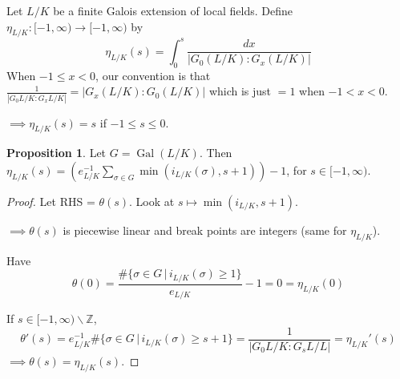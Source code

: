 \documentclass[a4paper]{article}
\theoremstyle{definition}
\theoremstyle{default}
\newtheorem{prop}[definition]{Proposition}
\theoremstyle{remark}
\newcommand*\abs[1]{\left|#1\right|}
\DeclareMathOperator{\Gal}{Gal}
\begin{document}
Let $L/K$ be a finite Galois extension of local fields.
Define $\eta_{L/K}: [-1, \infty) \to [-1, \infty)$ by
$$\eta_{L/K}(s) = \int_{0}^{s} \frac{dx}{\abs{G_0(L/K):G_x(L/K)}}$$
When $-1 \leq x < 0 $, our convention is that
$\frac{1}{\abs{G_0{L/K}:G_x{L/K}}} = \abs{G_x(L/K) : G_0(L/K)}$ which is just $=1$ when $-1 < x < 0$.

$\implies \eta_{L/K}(s)=s$ if $-1 \leq s \leq 0$.

\begin{prop}
	Let $G=\Gal(L/K)$.
	Then $\eta_{L/K}(s) = \left(e_{L/K}^{-1} \sum_{\sigma \in G}\min(i_{L/K}(\sigma), s+1)\right) - 1$,
	for $s \in [-1, \infty)$.
	\label{88}
\end{prop}
\begin{proof}
	Let RHS = $\theta(s)$.
	Look at $s \mapsto \min(i_{L/K}, s+1)$.
	
	$\implies \theta(s)$ is piecewise linear and break points are integers (same for $\eta_{L/K}$).
	
	Have
	$$\theta(0) = \frac{\#\{\sigma \in G \,|\, i_{L/K}(\sigma) \geq 1 \}}{e_{L/K}} - 1 = 0 = \eta_{L/K}(0)$$
	
	If $s \in [-1, \infty) \backslash \mathbb{Z}$,
	$$\theta'(s) = e_{L/K}^{-1} \# \{\sigma \in G \,|\, i_{L/K}(\sigma) \geq s+1 \} = \frac{1}{\abs{G_0{L/K}:G_s{L/L}}} = \eta_{L/K}'(s)$$
	$\implies \theta(s) = \eta_{L/K}(s)$.
\end{proof}
\end{document}
